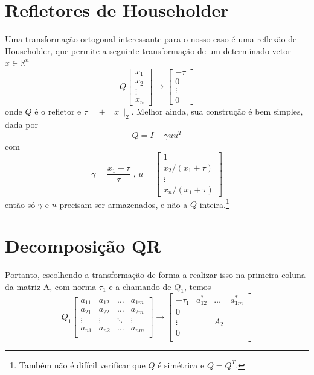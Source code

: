 \documentclass[a4paper,11pt]{article}
\begin{document}
    \section*{Refletores de Householder}

        Uma transformação ortogonal interessante para o nosso caso é uma reflexão de Householder, que permite a seguinte transformação de um determinado
        vetor $x \in \mathbb{R}^n$
        $$ Q\begin{bmatrix}
                x_1 \\
                x_2 \\
                \vdots \\
                x_n
            \end{bmatrix}
            \rightarrow
            \begin{bmatrix}
                -\tau  \\
                0      \\
                \vdots \\
                0
            \end{bmatrix}$$
        onde $Q$ é o refletor e $\tau = \pm \|x\|_2$.
        Melhor ainda, sua construção é bem simples, dada por
        $$ Q = I - \gamma u u^T $$
        com
        $$
            \gamma = \frac{x_1 + \tau}{\tau}\text{ , }
            u =
            \begin{bmatrix}
                1 \\
                x_2/(x_1+\tau) \\
                \vdots         \\
                x_n/(x_1+\tau)
            \end{bmatrix}
        $$
        então só $\gamma$ e $u$ precisam ser armazenados, e não a $Q$ inteira.\footnote{Também não é difícil verificar que $Q$ é simétrica e $Q = Q^T$.}

    \section*{Decomposição QR}
        Portanto, escolhendo a transformação de forma a realizar isso na primeira coluna da matriz A, com norma $\tau_1$ e a chamando de $Q_1$, temos
        $$ Q_1
        \begin{bmatrix}
            a_{11} & a_{12} & \dots & a_{1m} \\
            a_{21} & a_{22} & \dots & a_{2m} \\
            \vdots & \vdots & \ddots & \vdots \\
            a_{n1} & a_{n2} & \dots & a_{nm} \\
        \end{bmatrix}
        \rightarrow
        \left[
        \begin{array}{c|ccc}
            -\tau_1  & a_{12}^* & \dots & a_{1m}^* \\ \hline
                  0 &  &  &  \\
            \vdots &  & A_2 &  \\
                  0 &  &  &  \\
        \end{array}\right] $$
\end{document}
